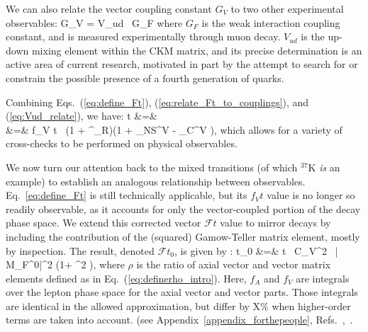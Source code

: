 We can also relate the vector coupling constant $G_V$ to two other experimental observables:
\bea
G_V = V_{ud}  \, G_F
\label{eq:Vud_relate}
\eea
where $G_F$ is the weak interaction coupling constant, and is measured experimentally through muon decay.  $V_{ud}$ is the up-down mixing element within the \ac{CKM} matrix, and its precise determination is an active area of current research, motivated in part by the attempt to search for or constrain the possible presence of a fourth generation of quarks.

Combining Eqs.~(\ref{eq:define_Ft}), (\ref{eq:relate_Ft_to_couplings}), and (\ref{eq:Vud_relate}), we have:
\bea
{}t &=&  
\nonumber \\
&=& 
f_V t \, (1 + \delta^\prime_R)(1 + \delta_{NS}^V - \delta_C^{V} ), 
\label{eq:Ft_with_Vud}
\eea
which allows for a variety of cross-checks to be performed on physical observables.  

We now turn our attention back to the mixed transitions (of which $^{37}$K \emph{is} an example) to establish an analogous relationship between observables.  Eq.~\ref{eq:define_Ft} is still technically applicable, but its $f_Vt$ value is no longer so readily observable, as it accounts for only the vector-coupled portion of the decay phase space.  We extend this corrected vector $\mathcal{F}t$ value to mirror decays by including the contribution of the (squared) Gamow-Teller matrix element, mostly by inspection.  The result, denoted $\mathcal{F}t_0$, is given by
\cite{shidling2014}
\cite{naviliat2009april}
\cite{ben_Abeta}:
\bea
{}t_0 &=&  t \, C_V^2 \, | M_F^0|^2 \left(1+ \rho^2 \right),
\label{eq:rhorelation}
\eea
where $\rho$ is the ratio of axial vector and vector matrix elements defined as in Eq.~(\ref{eq:definerho_intro}).  
Here, $f_A$ and $f_V$ are integrals over the lepton phase space for the axial vector and vector parts. Those integrals are identical in the allowed approximation, but differ by X\% when higher-order terms are taken into account.
(see Appendix~\ref{appendix_forthepeople}, Refs.~\cite{holstein},~\cite{Hayen2021}.


